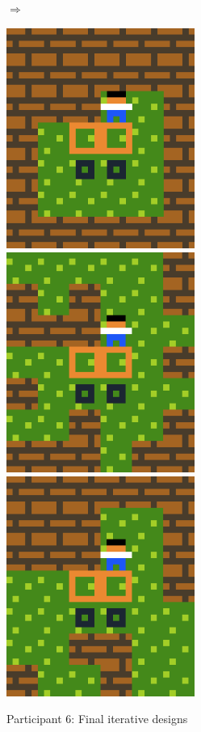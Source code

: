 \begin{figure}[!htbp]
\begin{minipage}{0.5\textwidth}
\end{minipage}  $\Longrightarrow$ \hfill
\begin{minipage}{0.4\textwidth}
\includegraphics[width=0.55\textwidth]{figures/firstmax_without.png} \hfill \\
\includegraphics[width=0.55\textwidth]{figures/secondmax_without.png} \hfill \\
\includegraphics[width=0.55\textwidth]{figures/thirdmax_without.png} \hfill \\
\end{minipage}
\caption{Participant 6: Final iterative designs}
\end{figure}


